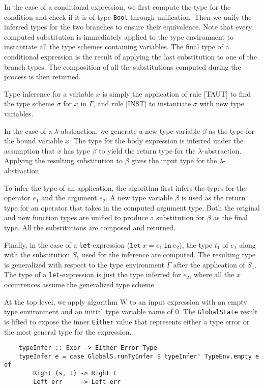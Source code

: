 In the case of a conditional expression, we first compute the type for the condition 
and check if it is of type \texttt{Bool} through unification. Then we unify 
the inferred types for the two branches to ensure their equivalence. 
Note that every computed substitution is immediately applied to the type 
environment to instantiate all the type schemes containing variables. The final 
type of a conditional expression is the result of applying the last substitution 
to one of the branch types. The composition of all the substitutions 
computed during the process is then returned. 

Type inference for a variable $x$ is simply the application of rule {\scriptsize{[TAUT]}} 
to find the type scheme $\sigma$ for $x$ in $\Gamma$, and rule {\scriptsize{[INST]}} 
to instantiate $\sigma$ with new type variables. 

In the case of a $\lambda$-abstraction, we generate a new type variable $\beta$ 
as the type for the bound variable $x$. The type for the body 
expression is inferred under the assumption that $x$ has type $\beta$ 
to yield the return type for the $\lambda$-abstraction. 
Applying the resulting substitution to $\beta$ gives the input type for 
the $\lambda$-abstraction.

To infer the type of an application, the algorithm first infers the types for the 
operator $e_1$ and the argument $e_2$. A new type variable $\beta$ is used as the return type 
for an operator that takes in the computed argument type. Both the original 
and new function types are unified to produce a substitution for $\beta$ as 
the final type. All the substitutions are composed and returned.

Finally, in the case of a \texttt{let}-expression ($\texttt{let} \: x = e_1 \: \texttt{in} \: e_2$), 
the type $t_1$ of $e_1$ along with the substitution $S_1$ used for the inference are computed. 
The resulting type is generalized with respect to the type environment $\Gamma$ after 
the application of $S_1$. The type of a \texttt{let}-expression is just the type inferred 
for $e_2$, where all the $x$ occurrences assume the generalized type scheme.

At the top level, we apply algorithm W to an input expression with an  
empty type environment and an initial type variable name of 0. The \lstinline{GlobalState} 
result is lifted to expose the inner \lstinline{Either} value that 
represents either a type error or the most general type for the expression.
\begin{lstlisting}
    typeInfer :: Expr -> Either Error Type
    typeInfer e = case GlobalS.runTyInfer $ typeInfer' TypeEnv.empty e of 
        Right (s, t) -> Right t 
        Left err     -> Left err 
\end{lstlisting}
